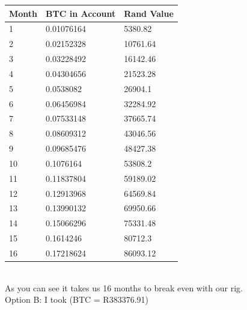 \begin{tabular}{ |p{2cm}||p{4cm}||p{2cm}|}
\hline
Month	&     BTC in Account&	Rand Value    \\
\hline
1	    &     0.01076164	   & 5380.82 \\
2	    &     0.02152328	   & 10761.64 \\
3	    &     0.03228492	   & 16142.46 \\
4	    &     0.04304656	   & 21523.28 \\
5	    &     0.0538082	    &26904.1 \\
6	    &     0.06456984	   & 32284.92 \\
7	    &     0.07533148	   & 37665.74 \\
8	    &     0.08609312	   & 43046.56 \\
9	    &     0.09685476	   & 48427.38 \\
10	   &      0.1076164	   & 53808.2 \\
11	   &      0.11837804	  &  59189.02 \\
12	   &      0.12913968	  &  64569.84 \\
13	   &      0.13990132	  &  69950.66 \\
14	   &      0.15066296	  &  75331.48 \\
15	   &      0.1614246	   & 80712.3 \\
16	   &      0.17218624	  &  86093.12 \\
\hline
\end{tabular} \\

As you can see it takes us 16 months to break even with our rig. \\

Option B: I took (BTC = R383376.91)\\

